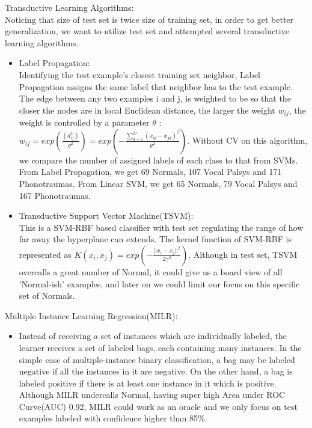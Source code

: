 Transductive Learning Algorithms:\newline\\
\indent Noticing that size of test set is twice size of training set, in order to get better generalization, we want to utilize test set and attempted several transductive learning algorithms. \\
\begin{itemize}
	\item Label Propagation:\\
	Identifying the test example's closest training set neighbor, Label Propagation assigns the same label that neighbor has to the test example. The edge between any two examples i and j, is weighted to be so that the closer the nodes are in local Euclidean distance, the larger the weight $w_{ij}$, the weight is controlled by a parameter $\theta$ :  $w_{ij} = exp (\frac{(d_{ij}^2)}{\theta^2}) = exp (-\frac{\sum_{d = 1}^{D} (x_{id} - x_{jd})^2}{\theta^2} )$. \cite{b13}Without CV on this algorithm, we compare the number of assigned labels of each class to that from SVMs. From Label Propagation, we get 69 Normals, 107 Vocal Palsys and 171 Phonotraumas. From Linear SVM, we get 65 Normals, 79 Vocal Palsys and 167 Phonotraumas.\\
	\item Transductive Support Vector Machine(TSVM):\\
	This is a SVM-RBF based classifier with test set regulating the range of how far away the hyperplane can extends. The kernel function of SVM-RBF is represented as $K(x_i,x_j) = exp(-\frac{||x_i - x_j ||^2}{2\gamma^2})$\cite{b14}. Although in test set, TSVM overcalls a great number of Normal, it could give us a board view of all 'Normal-ish' examples, and later on we could limit our focus on this specific set of Normals. \\
\end{itemize}

Multiple Instance Learning Regression(MILR):\\
\begin{itemize}
	\item 
	Instead of receiving a set of instances which are individually labeled, the learner receives a set of labeled bags, each containing many instances. In the simple case of multiple-instance binary classification, a bag may be labeled negative if all the instances in it are negative. On the other hand, a bag is labeled positive if there is at least one instance in it which is positive. \cite{b10} Although MILR undercalls Normal, having super high Area under ROC Curve(AUC) 0.92, MILR could work as an oracle and we only focus on test examples labeled with confidence higher than 85\%.\\
\end{itemize}
